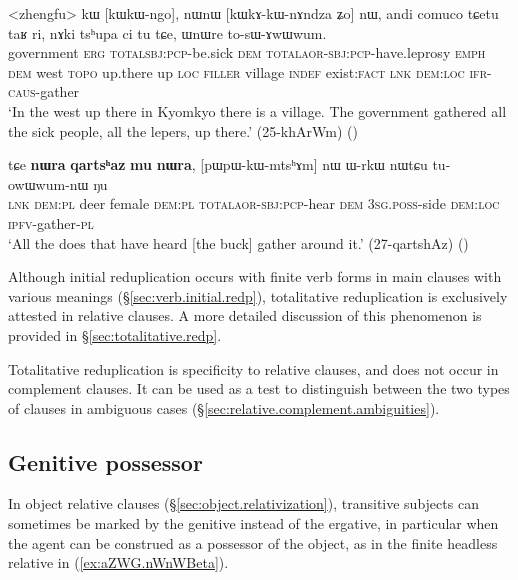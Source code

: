 \begin{exe}
\ex \label{ex:kWkWngo.kWkAkWnAndza}
\gll <zhengfu> kɯ [kɯ\redp{}kɯ-ngo], nɯnɯ [kɯ\redp{}kɤ-kɯ-nɤndza ʑo] nɯ, andi comuco tɕetu taʁ ri, nɤki tsʰupa ci tu tɕe, ɯnɯre to-sɯ-ɤwɯwum. \\
government \textsc{erg} \textsc{total}\redp{}\textsc{sbj}:\textsc{pcp}-be.sick \textsc{dem} \textsc{total}\redp{}\textsc{aor}-\textsc{sbj}:\textsc{pcp}-have.leprosy \textsc{emph} \textsc{dem} west  \textsc{topo} up.there up \textsc{loc} \textsc{filler} village \textsc{indef} exist:\textsc{fact} \textsc{lnk} \textsc{dem}:\textsc{loc} \textsc{ifr}-\textsc{caus}-gather \\
\glt `In the west up there in Kyomkyo there is a village. The government gathered all the sick people, all the lepers, up there.' (25-khArWm)
()
\end{exe}

\begin{exe}
\ex \label{ex:qartshaz.pWpWkWmtshAm}
\gll  tɕe \textbf{nɯra} \textbf{qartsʰaz} \textbf{mu} \textbf{nɯra},  [pɯ\redp{}pɯ-kɯ-mtsʰɤm] nɯ ɯ-rkɯ nɯtɕu tu-owɯwum-nɯ ŋu \\
\textsc{lnk} \textsc{dem}:\textsc{pl} deer female \textsc{dem}:\textsc{pl} \textsc{total}\redp{}\textsc{aor}-\textsc{sbj}:\textsc{pcp}-hear \textsc{dem} \textsc{3sg}.\textsc{poss}-side \textsc{dem}:\textsc{loc} \textsc{ipfv}-gather-\textsc{pl} \\
\glt `All the does that have heard [the buck] gather around it.' (27-qartshAz)
()
\end{exe}


Although initial reduplication occurs with finite verb forms in main clauses with various meanings (§\ref{sec:verb.initial.redp}), totalitative reduplication is exclusively attested in relative clauses. A more detailed discussion of this phenomenon is provided in §\ref{sec:totalitative.redp}.

Totalitative reduplication is specificity to relative clauses, and does not occur in complement clauses. It can be used as a test to distinguish between the two types of clauses in ambiguous cases (§\ref{sec:relative.complement.ambiguities}).

 \subsection{Genitive possessor } \label{sec:relative.genitive.possessor.subject}
In object relative clauses (§\ref{sec:object.relativization}), transitive subjects can sometimes be marked by the genitive instead of the ergative, in particular when the agent can be construed as a possessor of the object, as in the finite headless relative in (\ref{ex:aZWG.nWnWBeta}).  

